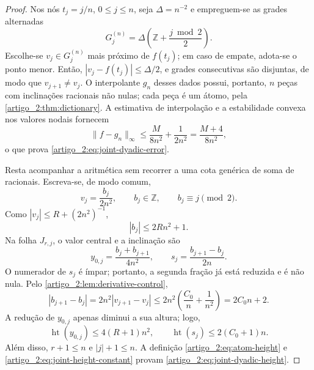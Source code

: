\documentclass[12pt,a4paper]{article}
\theoremstyle{preciso}
\theoremstyle{definition}
\newcommand{\height}{\operatorname{ht}}
\theoremstyle{preciso}
\theoremstyle{preciso}
\theoremstyle{preciso}
\theoremstyle{preciso}
\theoremstyle{definition}
\theoremstyle{preciso}
\theoremstyle{definition}
\theoremstyle{preciso}
\theoremstyle{preciso}
\theoremstyle{definition}
\begin{document}
\begin{proof}
Nos nós $t_j=j/n$, $0\le j\le n$, seja $\Delta=n^{-2}$ e empreguem-se as grades
alternadas
\begin{equation}
 G_j^{(n)}=\Delta\left(\mathbb Z+\frac{j\bmod2}{2}\right).
 \label{artigo_2:eq:joint-alternating-grid}
\end{equation}
Escolhe-se $v_j\in G_j^{(n)}$ mais próximo de $f(t_j)$; em caso de empate, adota-se o
ponto menor. Então, $|v_j-f(t_j)|\le\Delta/2$, e grades consecutivas são
disjuntas, de modo que $v_{j+1}\ne v_j$. O interpolante $g_n$ desses dados
possui, portanto, $n$ peças com inclinações racionais não nulas; cada peça é um
átomo, pela \cref{artigo_2:thm:dictionary}. A estimativa de interpolação e a
estabilidade convexa nos valores nodais fornecem
\[
 \|f-g_n\|_\infty
 \le\frac{M}{8n^2}+\frac{1}{2n^2}
 =\frac{M+4}{8n^2},
\]
o que prova \eqref{artigo_2:eq:joint-dyadic-error}.

Resta acompanhar a aritmética sem recorrer a uma cota genérica de soma de
racionais. Escreva-se, de modo comum,
\begin{equation}
 v_j=\frac{b_j}{2n^2},\qquad b_j\in\mathbb Z,
 \qquad b_j\equiv j\pmod2.
 \label{artigo_2:eq:joint-common-denominator}
\end{equation}
Como $|v_j|\le R+(2n^2)^{-1}$,
\begin{equation}
 |b_j|\le2Rn^2+1.
 \label{artigo_2:eq:joint-numerator-bound}
\end{equation}
Na folha $J_{r,j}$, o valor central e a inclinação são
\begin{equation}
 y_{0,j}=\frac{b_j+b_{j+1}}{4n^2},
 \qquad
 s_j=\frac{b_{j+1}-b_j}{2n}.
 \label{artigo_2:eq:joint-atom-parameters}
\end{equation}
O numerador de $s_j$ é ímpar; portanto, a segunda fração já está reduzida e é
não nula. Pelo \cref{artigo_2:lem:derivative-control},
\begin{equation}
 |b_{j+1}-b_j|
 =2n^2|v_{j+1}-v_j|
 \le2n^2\left(\frac{C_0}{n}+\frac1{n^2}\right)
 =2C_0n+2.
 \label{artigo_2:eq:joint-slope-numerator}
\end{equation}
A redução de $y_{0,j}$ apenas diminui a sua altura; logo,
\begin{equation}
 \height(y_{0,j})\le4(R+1)n^2,
 \qquad
 \height(s_j)\le2(C_0+1)n.
 \label{artigo_2:eq:joint-parameter-heights}
\end{equation}
Além disso, $r+1\le n$ e $|j|+1\le n$. A definição
\eqref{artigo_2:eq:atom-height} e \eqref{artigo_2:eq:joint-height-constant} provam
\eqref{artigo_2:eq:joint-dyadic-height}.


\end{proof}
\end{document}
